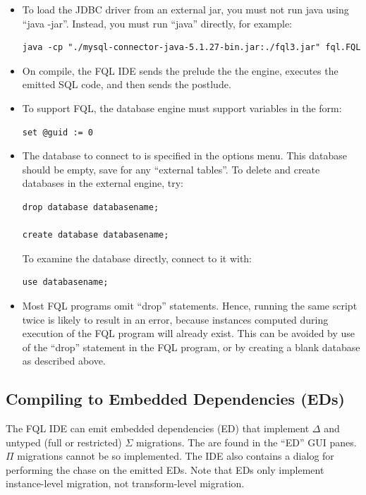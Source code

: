 \documentclass[12pt]{article}
\begin{document}
\begin{itemize}
\item To load the JDBC driver from an external jar, you must not run java using ``java -jar''.  Instead, you must run ``java'' directly, for example:
\begin{verbatim}
java -cp "./mysql-connector-java-5.1.27-bin.jar:./fql3.jar" fql.FQL 
\end{verbatim}

\item On compile, the FQL IDE sends the prelude the the engine, executes the emitted SQL code, and then sends the postlude.

\item To support FQL, the database engine must support variables in the form:
\begin{verbatim}
set @guid := 0
\end{verbatim}

\item The database to connect to is specified in the options menu.  This database should be empty, save for any ``external tables''.  To delete and create databases in the external engine, try:
\begin{verbatim}
drop database databasename;  

create database databasename;
\end{verbatim}
To examine the database directly, connect to it with:
\begin{verbatim}
use databasename;
\end{verbatim}

\item Most FQL programs omit ``drop'' statements.  Hence, running the same script twice is likely to result in an error, because instances computed during execution of the FQL program will already exist.  This can be avoided by use of the ``drop'' statement in the FQL program, or by creating a blank database as described above.
\end{itemize}

\subsection{Compiling to Embedded Dependencies (EDs)}

The FQL IDE can emit embedded dependencies (ED) that implement $\Delta$ and untyped (full or restricted) $\Sigma$ migrations.  The are found in the ``ED'' GUI panes.  $\Pi$ migrations cannot be so implemented.  The IDE also contains a dialog for performing the chase on the emitted EDs.  Note that EDs only implement instance-level migration, not transform-level migration.
\end{document}
